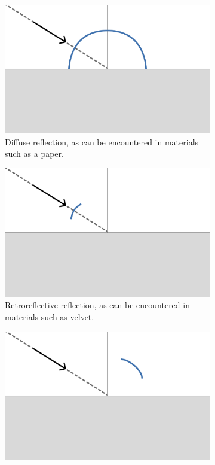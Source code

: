 \begin{figure}[H]
  \centering
  \begin{subfigure}[b]{0.45\textwidth}
      \includegraphics[width=\textwidth]{resources/reflection-diffuse.png}
      \caption{Diffuse reflection, as can be encountered in materials such as a paper.}
      \label{fig:reflectionDiffuse}
  \end{subfigure}
  \hfill
  \begin{subfigure}[b]{0.45\textwidth}
      \includegraphics[width=\textwidth]{resources/reflection-retroreflective.png}
      \caption{Retroreflective reflection, as can be encountered in materials such as velvet.}
      \label{fig:reflectionRetroreflective}
  \end{subfigure}
  \begin{subfigure}[b]{0.45\textwidth}
    \includegraphics[width=\textwidth]{resources/reflection-glossy-specular.png}

\end{subfigure}
\end{figure}

